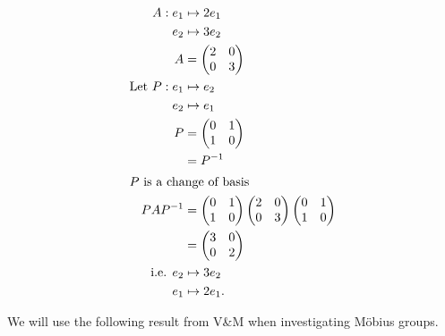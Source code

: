 \begin{example}
    \begin{align*}
        A : e_1 &\mapsto 2 e_1 \\
        e_2 &\mapsto 3e_2 \\
        A &= \begin{pmatrix}
        2 & 0 \\
        0 & 3
        \end{pmatrix} \\
        \text{Let } P : e_1 &\mapsto e_2 \\
        e_2 &\mapsto e_1 \\
        P &= \begin{pmatrix}
        0 & 1 \\
        1 & 0
        \end{pmatrix} \\
        &= P^{-1} \\
        \intertext{$P$ is a change of basis}
        PAP^{-1} &= \begin{pmatrix}
            0 & 1 \\
            1 & 0
            \end{pmatrix} \begin{pmatrix}
                2 & 0 \\
                0 & 3
                \end{pmatrix} \begin{pmatrix}
                0 & 1 \\
                1 & 0
                \end{pmatrix} \\
            &= \begin{pmatrix}
            3 & 0 \\
            0 & 2
            \end{pmatrix} \\
        \text{i.e. } e_2 &\mapsto 3e_2 \\
        e_1 &\mapsto 2 e_1.
    \end{align*}
\end{example} 

We will use the following result from V\&M when investigating M\"obius groups.

